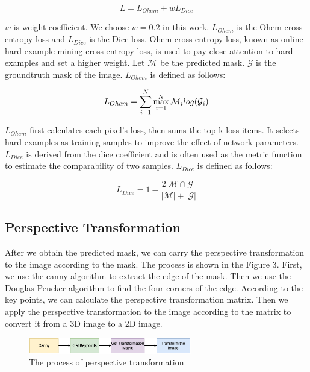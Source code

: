 \documentclass[10pt, conference, compsocconf]{IEEEtran}
\begin{document}
\begin{equation}
	L = L_{Ohem} + w L_{Dice}
\end{equation}

$w$ is weight coefficient. We choose $w = 0.2$ in this work. $L_{Ohem}$ is the Ohem cross-entropy loss and $L_{Dice}$ is the Dice loss. Ohem cross-entropy loss, known as online hard example mining cross-entropy loss, is used to pay close attention to hard examples and set a higher weight. Let $\mathcal{M}$ be the predicted mask. $\mathcal{G}$ is the groundtruth mask of the image. $L_{Ohem}$ is defined as follows:

\begin{equation}
	L_{Ohem} = \sum_{i=1}^{N} \max_{i=1}^{N} \mathcal{M}_i log(\mathcal{G}_i) \\
\end{equation}

$L_{Ohem}$ first calculates each pixel's loss, then sums the top k loss items. It selects hard examples as training samples to improve the effect of network parameters. $L_{Dice}$ is derived from the dice coefficient and is often used as the metric function to estimate the comparability of two samples.  $L_{Dice}$ is defined as follows:

\begin{equation}
	L_{Dice} = 1 - \frac{2|\mathcal{M} \cap \mathcal{G}|}{|\mathcal{M}| + |\mathcal{G}|}
\end{equation}


\subsection{Perspective Transformation}

After we obtain the predicted mask, we can carry the perspective transformation to the image according to the mask.
The process is shown in the Figure 3. First, we use the canny\cite{bao2005canny} algorithm to extract the edge of the mask. Then we use the Douglas-Peucker algorithm\cite{wu2004douglas} to find the four corners of the edge. According to the key points, we can calculate the perspective transformation matrix. Then we apply the perspective transformation to the image according to the matrix to convert it from a 3D image to a 2D image.


\begin{figure}[!h]
	\centering
	\includegraphics[width=2.8in]{./Assets/123.jpg}
	\caption{The process of perspective transformation}
\end{figure}
\end{document}
